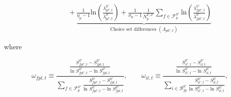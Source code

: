 \begin{linenomath*}
\begin{equation}
\begin{aligned}
                & \qquad +
                \underbrace{
                    \frac{1}{\eta_p-1}
                    \text{ln}
                    \left(
                        \frac{\lambda^{ll'}_{pl',t}}{\lambda^{ll'}_{pl',t}}
                    \right)
                    + 
                    \frac{1}{\sigma_p-1}
                    \frac{1}{N^{F,ll'}_{p}}
                    \sum_{f \in \mathcal{F}^{ll'}_{p}} 
                        \text{ln}
                        \left(
                            \frac{\lambda^{ll'}_{fpl',t}}{\lambda^{ll'}_{fpl',t}}
                        \right)
                }_{\text{Choice set differences } (\Lambda_{pll',t})}
    \end{aligned}
    \end{equation}
\end{linenomath*}
where 
\begin{linenomath*}
    \begin{equation*}
        \omega_{fpl,t} 
            \equiv  \frac{
                        \frac{S^{ll'}_{fpl',t} - S^{ll'}_{fpl,t}}
                             {\text{ln }S^{ll'}_{fpl',t} - \text{ln }S^{ll'}_{fpl,t}}}
                         {\sum_{f \in \mathcal{F}^{ll'}_{p}} 
                            \frac{S^{ll'}_{fpl',t} - S^{ll'}_{fpl,t}}
                            {\text{ln }S^{ll'}_{fpl',t} - \text{ln }S^{ll'}_{fpl,t}}}, 
        \qquad 
        \omega_{il,t} 
            \equiv  \frac{
                        \frac{S^{ll'}_{il',t} - S^{ll'}_{il,t}}
                             {\text{ln }S^{ll'}_{il',t} - \text{ln }S^{ll'}_{il,t}}}
                         {\sum_{i \in \mathcal{B}^{ll'}_{fp}} 
                            \frac{S^{ll'}_{il',t} - S^{ll'}_{il,t}}
                            {\text{ln }S^{ll'}_{il',t} - \text{ln }S^{ll'}_{il,t}}}, 
    \end{equation*}
\end{linenomath*}
